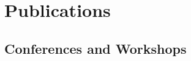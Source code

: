 \documentclass[letterpaper,10pt]{article}
\renewenvironment{itemize}{
  \begin{list}{}{
    \setlength{\leftmargin}{1.5em}
  }
}{
  \end{list}
}
\begin{document}
\section*{Publications}



\subsection*{Conferences and Workshops} %
\end{document}
